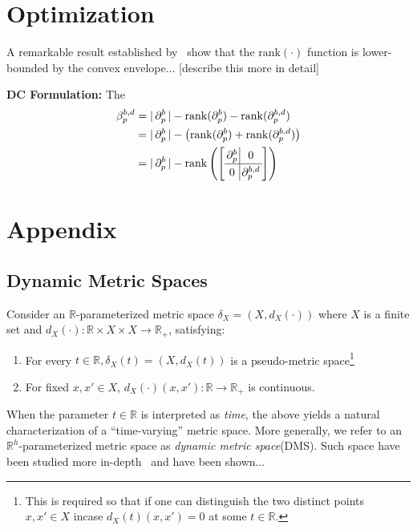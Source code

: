 \documentclass[10pt]{article}
\begin{document}
\section*{Optimization}

A remarkable result established by~\cite{} show that the $\mathrm{rank}(\cdot)$ function is lower-bounded by the convex envelope... [describe this more in detail]


\noindent  \textbf{DC Formulation:}
The 
\begin{align}
	\beta_p^{b,d} &= \lvert \, \partial_p^b \, \rvert - \mathrm{rank}(\partial_p^b) - \mathrm{rank}(\partial_p^{b,d}) \\
	&= \lvert \, \partial_p^b \, \rvert - \left( \mathrm{rank}(\partial_p^b) + \mathrm{rank}(\partial_p^{b,d}) \right) \\
	&=
	\lvert \, \partial_p^b \, \rvert - 
	\arraycolsep=1.8pt\def\arraystretch{1.25}
	\mathrm{rank}\left(\left[\begin{array}{c|c}
 		\partial_p^{b} & 0 \\
		\hline
		0 & \partial_p^{b,d}
	\end{array}\right] \right) \label{eq:block_pb}
\end{align}


\appendix
\section{Appendix}

\subsection*{Dynamic Metric Spaces}
Consider an $\mathbb{R}$-parameterized metric space $\delta_X = ( X, d_X(\cdot) )$ where
$X$ is a finite set and $d_X(\cdot): \mathbb{R} \times X \times X \to \mathbb{R}_{+}$, satisfying: 
\begin{enumerate}
	\item For every $t \in \mathbb{R}, \delta_X(t) = (X, d_X(t))$ is a pseudo-metric space\footnote{This is required so that if one can distinguish the two distinct points $x, x' \in X$ incase $d_X(t)(x, x') = 0$ at some $t \in \mathbb{R}$. } 
	\item For fixed $x, x' \in X$, $d_X(\cdot)(x, x'): \mathbb{R} \to \mathbb{R}_{+}$ is continuous.
\end{enumerate}
When the parameter $t \in \mathbb{R}$ is interpreted as \emph{time}, the above yields a natural characterization of a ``time-varying'' metric space. More generally, we refer to an $\mathbb{R}^h$-parameterized metric space as \emph{dynamic metric space}(DMS). Such space have been studied more in-depth~\cite{} and have been shown...
 
\end{document}
